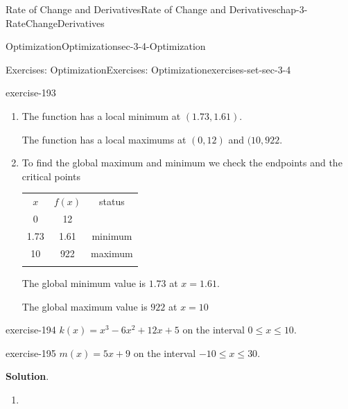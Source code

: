 \documentclass[oneside,10pt,]{book}
\numberwithin{equation}{section}
\newcommand{\hrulethin}  {\noalign{\hrule height 0.04em}}
\newcommand{\hrulethick} {\noalign{\hrule height 0.11em}}
\newcommand{\lt}{<}
\begin{document}
\begin{chapterptx}{Rate of Change and Derivatives}{}{Rate of Change and Derivatives}{}{}{chap-3-RateChangeDerivatives}
\begin{sectionptx}{Optimization}{}{Optimization}{}{}{sec-3-4-Optimization}
\begin{exercises-subsection-numberless}{Exercises: Optimization}{}{Exercises: Optimization}{}{}{exercises-set-sec-3-4}
\begin{exercisegroup}
\begin{divisionexerciseeg}{3}{}{}{exercise-193}
\begin{enumerate}[label=(\alph*)]
\par
\hypertarget{p-1262}{}%
The function \(f\) is decreasing for \(0\lt x \lt 1.73\).%
\par
\hypertarget{p-1263}{}%
The function \(f\) is increasing for \(1.73 \lt x\lt 10\)%
\item\hypertarget{li-398}{}\hypertarget{p-1264}{}%
The function has a local minimum at \((1.73, 1.61)\).%
\par
\hypertarget{p-1265}{}%
The function has a local maximums at \((0, 12)\) and \((10, 922\).%
\item\hypertarget{li-399}{}\hypertarget{p-1266}{}%
To find the global maximum and minimum we check the endpoints and the critical points%
\begin{sidebyside}{1}{0}{0}{0}%
\begin{sbspanel}{1}%
{\centering%
\begin{tabular}{ccc}\hrulethick
\(x\)&\(f(x)\)&status\tabularnewline\hrulethin
0&12&\tabularnewline\hrulethin
1.73&1.61&minimum\tabularnewline\hrulethin
10&922&maximum\tabularnewline\hrulethin
\end{tabular}
\par}
\end{sbspanel}%
\end{sidebyside}%
\par
\hypertarget{p-1267}{}%
The global minimum value is  \(1.73\) at \(x=1.61.\)%
\par
\hypertarget{p-1268}{}%
The global maximum value is  \(922\) at \(x=10\)%
\end{enumerate}
\end{divisionexerciseeg}%
\begin{divisionexerciseeg}{4}{}{}{exercise-194}%
\hypertarget{p-1269}{}%
\(k(x)=x^3-6x^2+12x+5\) on the interval \(0\le x\le 10\).%
\end{divisionexerciseeg}%
\begin{divisionexerciseeg}{5}{}{}{exercise-195}%
\hypertarget{p-1270}{}%
\(m(x)=5x+9\) on the interval \(-10\le x\le 30\).%
\par\smallskip%
\noindent\textbf{Solution}.\hypertarget{solution-97}{}\quad%
\leavevmode%
\begin{enumerate}[label=(\alph*)]
\item\hypertarget{li-400}{}\leavevmode%
\begin{sidebyside}{1}{0.1}{0.1}{0}%
\begin{sbspanel}{0.8}%

\end{sbspanel}
\end{sidebyside}
\end{enumerate}
\end{divisionexerciseeg}
\end{exercisegroup}
\end{exercises-subsection-numberless}
\end{sectionptx}
\end{chapterptx}
\end{document}
